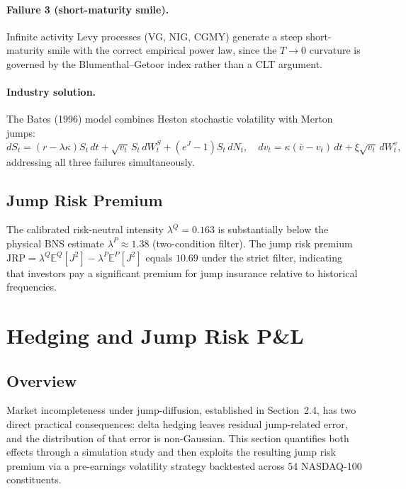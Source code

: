 \documentclass[12pt]{article}
\begin{document}
\paragraph{Failure 3 (short-maturity smile).}
Infinite activity Levy processes (VG, NIG, CGMY) generate a steep
short-maturity smile with the correct empirical power law, since the
$T \to 0$ curvature is governed by the Blumenthal--Getoor index rather than
a CLT argument.

\paragraph{Industry solution.}
The Bates (1996) model combines Heston stochastic volatility with Merton jumps:
\[
    dS_t = (r-\lambda\kappa)S_t\,dt + \sqrt{v_t}\,S_t\,dW_t^S
           + (e^J-1)S_t\,dN_t, \quad
    dv_t = \kappa(\bar{v}-v_t)\,dt + \xi\sqrt{v_t}\,dW_t^v,
\]
addressing all three failures simultaneously.

\subsection*{Jump Risk Premium}

The calibrated risk-neutral intensity $\lambda^Q = 0.163$ is substantially
below the physical BNS estimate $\lambda^P \approx 1.38$ (two-condition
filter). The jump risk premium $\mathrm{JRP} = \lambda^Q\mathbb{E}^Q[J^2]
- \lambda^P\mathbb{E}^P[J^2]$ equals $10.69$ under the strict filter,
indicating that investors pay a significant premium for jump insurance
relative to historical frequencies.


\section*{Hedging and Jump Risk P\&L}

\subsection*{Overview}

Market incompleteness under jump-diffusion, established in Section~2.4,
has two direct practical consequences: delta hedging leaves residual
jump-related error, and the distribution of that error is non-Gaussian.
This section quantifies both effects through a simulation study and then
exploits the resulting jump risk premium via a pre-earnings volatility
strategy backtested across 54 NASDAQ-100 constituents.
\end{document}
